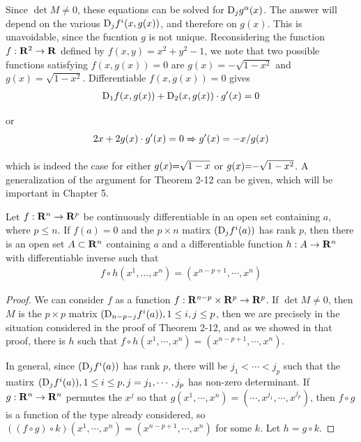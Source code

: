 Since $\det M\neq 0$, these equations can be solved for $\mathrm{D}_jg^\alpha(x)$.
The answer will depend on the various $\mathrm{D}_jf^i(x, g(x))$, and therefore 
on $g(x)$. This is unavoidable, since the fucntion $g$ is not unique.
Reconsidering the function $f:\mathbf{R}^2\to \mathbf{R}$ defined by $f(x, y) = x^2 + y^2 -1$, we 
note that two possible functions satisfying $f(x, g(x)) = 0$ are $g(x) = -\sqrt{1-x^2}$ and 
$g(x) = \sqrt{1-x^2}$. Differentiable $f(x, g(x)) = 0$ gives 
\begin{align*}
    \mathrm{D}_1f(x, g(x)) + \mathrm{D}_2(x, g(x))\cdot g'(x) = 0
\end{align*}

or 
\begin{align*}
    2x + 2g(x)\cdot g'(x) = 0 
    \xRightarrow[]{} g'(x) = -x/g(x)
\end{align*}

which is indeed the case for either 
$g(x)\hspace*{-3pt} =\hspace*{-3pt} \sqrt{1-x}$ or $g(x)\hspace*{-3pt} =\hspace*{-3pt} -\sqrt{1-x^2}$.
A generalization of the argument for Theorem 2-12 can be given, which will be important in Chapter 5. 

\begin{theorem}
    Let $f:\mathbf{R}^n\to \mathbf{R}^p$ be continuously differentiable in an open set 
    containing $a$, where $p\le n$. If $f(a)=0$ and the $p\times n$ matirx $(\mathrm{D}_jf^i(a))$ has 
    rank $p$, then there is an open set $A\subset \mathbf{R}^n$ containing $a$ and a differentiable 
    function $h:A\to \mathbf{R}^n$ with differentiable inverse such that 
    \begin{align*}
        f\circ h(x^1, \dots, x^n) = (x^{n-p+1}, \cdots, x^n)
    \end{align*}  
\end{theorem}

\begin{proof}
    We can consider $f$ as a function $f:\mathbf{R}^{n-p}\times \mathbf{R}^p\to \mathbf{R}^p$.
    If $\det M\neq 0$, then $M$ is the $p\times p$ matrix $(\mathrm{D}_{n-p-j}f^i(a)), 1\le i,j\le p$,
    then we are precisely in the situation considered in the proof of Theorem 2-12, and as we 
    showed in that proof, there is $h$ such that $f\circ h(x^1, \cdots, x^n) = (x^{n-p+1}, \cdots, x^n)$.
    
    In general, since $(\mathrm{D}_jf^i(a))$ has rank $p$, there will be $j_1<\cdots<j_p$ such that the
    matirx $(\mathrm{D}_jf^i(a)), 1\le i\le p, j=j_1, \cdots, j_p$ has non-zero determinant. If $g:\mathbf{R}^n\to \mathbf{R}^n$ 
    permutes the $x^j$ so that $g(x^1, \cdots, x^n) = (\cdots, x^{j_1}, \cdots, x^{j_p})$, then 
    $f\circ g$ is a function of the type already considered, so $((f\circ g)\circ k)(x^1,\cdots, x^n) = (x^{n-p+1}, \cdots, x^n)$ 
    for some $k$.  Let $h=g\circ k$.  
\end{proof}

